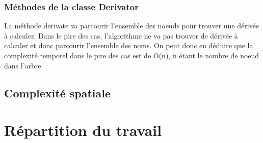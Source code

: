 \documentclass[11pt]{article}
\begin{document}
\subsubsection*{Méthodes de la classe Derivator}
La méthode derivate va parcourir l'ensemble des noeuds pour trouver une dérivée à calculer. Dans le pire des cas, l'algorithme ne va pas trouver de dérivée à calculer et donc parcourir l'ensemble des noms. On peut donc en déduire que la complexité temporel dans le pire des cas est de O(n), n étant le nombre de noeud dans l'arbre.



\subsection{Complexité spatiale}

\section{Répartition du travail}
\end{document}
